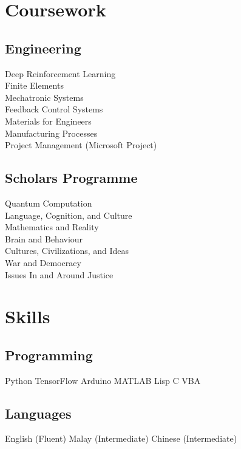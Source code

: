 \documentclass[]{deedy-resume-openfont}
\begin{document}
\begin{minipage}[t]{0.33\textwidth}

\section{Coursework}
\subsection{Engineering}
Deep Reinforcement Learning \\
Finite Elements \\
Mechatronic Systems \\
Feedback Control Systems \\
Materials for Engineers \\
Manufacturing Processes \\
Project Management (Microsoft Project) \\

\sectionsep

\subsection{Scholars Programme}
Quantum Computation \\
Language, Cognition, and Culture \\
Mathematics and Reality \\
Brain and Behaviour \\
Cultures, Civilizations, and Ideas \\
War and Democracy \\
Issues In and Around Justice \\


\section{Skills}
\subsection{Programming}
Python \textbullet{} TensorFlow \textbullet{} Arduino \textbullet{} MATLAB \textbullet{} Lisp \textbullet{} C \textbullet{} VBA \\
\sectionsep

\subsection{Languages}
English (Fluent) \textbullet{} Malay (Intermediate) \textbullet{} Chinese (Intermediate)\\
\sectionsep


\end{minipage}
\end{document}
